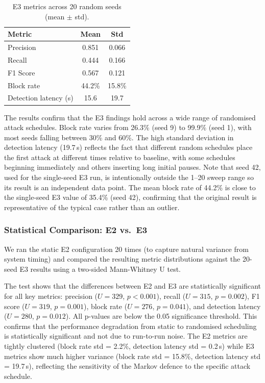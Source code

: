 \begin{table}[t]
\centering
\caption{E3 metrics across 20 random seeds (mean $\pm$ std).}
\label{tab:e3_multiseed}
\renewcommand{\arraystretch}{1.15}
\begin{tabular}{lcc}
\toprule
\textbf{Metric} & \textbf{Mean} & \textbf{Std} \\
\midrule
Precision & 0.851 & 0.066 \\
Recall & 0.444 & 0.166 \\
F1 Score & 0.567 & 0.121 \\
Block rate & 44.2\% & 15.8\% \\
Detection latency (s) & 15.6 & 19.7 \\
\bottomrule
\end{tabular}
\end{table}

The results confirm that the E3 findings hold across a wide range of randomised attack schedules.
Block rate varies from 26.3\% (seed 9) to 99.9\% (seed 1), with most seeds falling between 30\% and 60\%.
The high standard deviation in detection latency (19.7\,s) reflects the fact that different random schedules place the first attack at different times relative to baseline, with some schedules beginning immediately and others inserting long initial pauses.
Note that seed 42, used for the single-seed E3 run, is intentionally outside the 1--20 sweep range so its result is an independent data point.
The mean block rate of 44.2\% is close to the single-seed E3 value of 35.4\% (seed 42), confirming that the original result is representative of the typical case rather than an outlier.

\subsubsection{Statistical Comparison: E2 vs.\ E3}

We ran the static E2 configuration 20 times (to capture natural variance from system timing) and compared the resulting metric distributions against the 20-seed E3 results using a two-sided Mann-Whitney U test.

The test shows that the differences between E2 and E3 are statistically significant for all key metrics:
precision ($U = 329$, $p < 0.001$),
recall ($U = 315$, $p = 0.002$),
F1 score ($U = 319$, $p = 0.001$),
block rate ($U = 276$, $p = 0.041$), and
detection latency ($U = 280$, $p = 0.012$).
All p-values are below the 0.05 significance threshold.
This confirms that the performance degradation from static to randomised scheduling is statistically significant and not due to run-to-run noise.
The E2 metrics are tightly clustered (block rate std = 2.2\%, detection latency std = 0.2\,s) while E3 metrics show much higher variance (block rate std = 15.8\%, detection latency std = 19.7\,s), reflecting the sensitivity of the Markov defence to the specific attack schedule.

